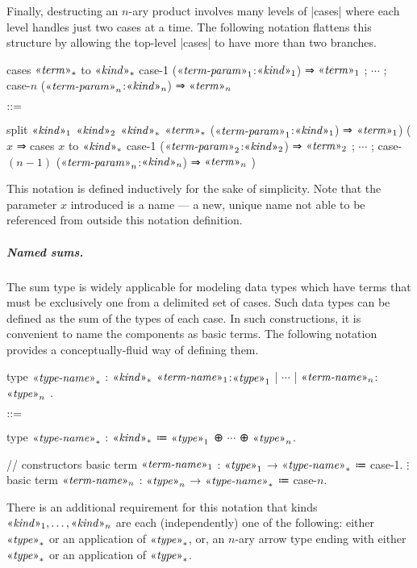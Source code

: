 \newpage
Finally, destructing an $n$-ary product involves many levels of \code|cases| where each level handles just two cases at a time.
The following notation flattens this structure by allowing the top-level \code|cases| to have more than two branches.
\begin{notational}[caption={Notation for destructing $n$-ary sum types}, label={lst:not-desctruct-n-sum-type}]
cases $\mvar{term}_*$ to $\mvar{kind}_*$
  { case-1 ($\mvar{term-param}_1$:$\mvar{kind}_1$) ⇒ $\mvar{term}_1$
  ; $\cdots$
  ; case-$n$ ($\mvar{term-param}_n$:$\mvar{kind}_n$) ⇒ $\mvar{term}_n$ }

$\syneq$

split $\mvar{kind}_1$ $\mvar{kind}_2$ $\mvar{kind}_*$
  $\mvar{term}_*$
  ($\mvar{term-param}_1$:$\mvar{kind}_1$) ⇒ $\mvar{term}_1$)
  ($x$ ⇒ cases $x$ to $\mvar{kind}_*$
          { case-1 ($\mvar{term-param}_2$:$\mvar{kind}_2$) ⇒ $\mvar{term}_2$
          ; $\cdots$
          ; case-$(n-1)$ ($\mvar{term-param}_n$:$\mvar{kind}_n$) ⇒ $\mvar{term}_n$ })
\end{notational}
This notation is defined inductively for the sake of simplicity.
Note that the parameter $x$ introduced is a  name --- a new, unique name not able to be referenced from outside this notation definition.

\newpage
\subparagraph{Named sums.}
The sum type is widely applicable for modeling data types which have terms that must be exclusively one from a delimited set of cases.
Such data types can be defined as the sum of the types of each case.
In such constructions, it is convenient to name the components as basic terms.
The following notation provides a conceptually-fluid way of defining them.
\begin{notational}[caption={Notation for defining named sum types and constructing named sum terms}]
type $\mvar{type-name}_*$ : $\mvar{kind}_*$
  { $\mvar{term-name}_1$:$\mvar{type}_1$ | $\cdots$ | $\mvar{term-name}_n$:$\mvar{type}_n$ }.

$\syneq$

type $\mvar{type-name}_*$ : $\mvar{kind}_*$ ≔ $\mvar{type}_1$ ⊕ $\cdots$ ⊕ $\mvar{type}_n$.

// constructors
basic term $\mvar{term-name}_1$ : $\mvar{type}_1$ → $\mvar{type-name}_*$ ≔ case-1.
$\vdots$
basic term $\mvar{term-name}_n$ : $\mvar{type}_n$ → $\mvar{type-name}_*$ ≔ case-$n$.
\end{notational}
There is an additional requirement for this notation that kinds $\mvar{kind}_1, \dots, \mvar{kind}_n$ are each (independently) one of the following:
either $\mvar{type}_*$ or an application of $\mvar{type}_*$, or,
an $n$-ary arrow type ending with either $\mvar{type}_*$ or an application of $\mvar{type}_*$.

